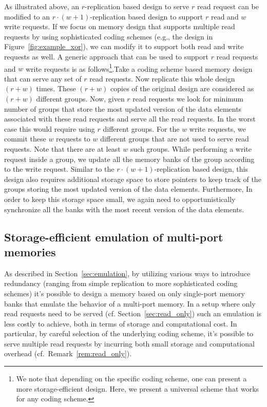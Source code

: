 \begin{remark}
\label{rem:rw}
As illustrated above, an $r$-replication based design to serve $r$ read request can be modified to an $r\cdot(w+1)$-replication based design to support $r$ read and $w$ write requests. If we focus on memory design that supports multiple read requests by using sophisticated coding schemes (e.g., the design in Figure~\ref{fig:example_xor}), we can modify it to support both read and write requests as well. A generic approach that can be used to support $r$ read requests and $w$ write requests is as follows\footnote{We note that depending on the specific coding scheme, one can present a more storage-efficient design. Here, we present a universal scheme that works for any coding scheme.}.Take a coding scheme based memory design that can serve any set of $r$ read requests. Now replicate this whole design $(r + w)$ times. These $(r + w)$ copies of the original design are considered as $(r + w)$ different groups. Now, given $r$ read requests we look for minimum number of groups that store the most updated version of the data elements associated with these read requests and serve all the read requests. In the worst case this would require using $r$ different groups. For the $w$ write requests, we commit these $w$ requests to $w$ different groups that are not used to serve read requests. Note that there are at least $w$ such groups. While performing a write request inside a group, we update all the memory banks of the group according to the write request. Similar to the $r\cdot(w + 1)$-replication based design, this design also requires additional storage space to store pointers to keep track of the groups storing the most  updated version of the data elements. Furthermore, In order to keep this storage space small, we again need to opportunistically synchronize all the banks with the most recent version of the data elements.
\end{remark}

\subsection{Storage-efficient emulation of multi-port memories}
\label{sec:efficient_emulation}

As described in Section~\ref{sec:emulation}, by utilizing various ways to introduce redundancy (ranging from simple replication to more sophisticated coding schemes) it's possible to design a memory based on only single-port memory banks that emulate the behavior of a multi-port memory. In a setup where only read requests need to be served (cf. Section~\ref{sec:read_only}) such an emulation is less costly to achieve, both in terms of storage and computational cost. In particular, by careful selection of the underlying coding scheme, it's possible to serve multiple read requests by incurring both small storage and computational overhead (cf.~Remark~\ref{rem:read_only}). 

